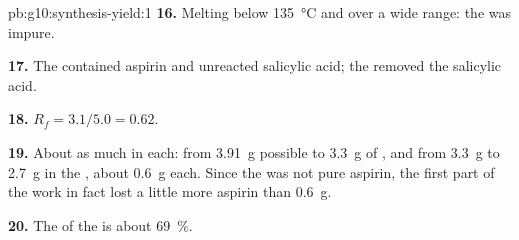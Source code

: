 \begin{solution}{pb:g10:synthesis-yield:1}
\textbf{16.} Melting below \qty{135}{\celsius} and over a wide range:
the  was impure.

\textbf{17.} The  contained aspirin and unreacted salicylic
acid; the  removed the salicylic acid.

\textbf{18.} $R_f = 3.1 / 5.0 = 0.62$.

\textbf{19.} About as much in each: from \qty{3.91}{g} possible to
\qty{3.3}{g} of , and from \qty{3.3}{g} to \qty{2.7}{g} in
the , about \qty{0.6}{g} each. Since the 
was not pure aspirin, the first part of the work in fact lost a little
more aspirin than \qty{0.6}{g}.

\textbf{20.} The  of the  is about \qty{69}{\percent}.
\end{solution}
